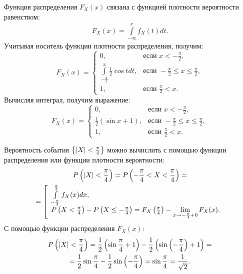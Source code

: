 Функция распределения $F_X(x)$ связана с функцией плотности вероятности равенством:
\begin{gather}
    F_X(x) = \int \limits_{-\infty}^x f_X(t) dt .
\end{gather}
Учитывая носитель функции плотности распределения, получим:
\begin{equation}
    F_X(x)
    = \left \{
    \begin{array}{ll}
        0,                                              & \text{если } x < - \frac{\pi}{2},                    \\
        \int \limits_{-\frac{\pi}{2}}^x \frac{1}{2} \cos t dt, & \text{если } -\frac{\pi}{2} \le x \le \frac{\pi}{2}, \\
        1,                                              & \text{если } \frac{\pi}{2} < x .
    \end{array}
    \right .
\end{equation}
Вычисляя интеграл, получим выражение:
\begin{equation}
    F_X(x)
    = \left \{
    \begin{array}{ll}
        0,                                       & \text{если } x < - \frac{\pi}{2},                    \\
        \frac{1}{2} \left ( \sin x + 1 \right ), & \text{если } -\frac{\pi}{2} \le x \le \frac{\pi}{2}, \\
        1,                                       & \text{если } \frac{\pi}{2} < x .
    \end{array}
    \right .
\end{equation}

Вероятность события $\left \{ \left | X \right | < \frac{\pi}{4} \right \}$ можно вычислить с помощью функции распределения или функции плотности вероятности:
\begin{multline}
    P \left ( \left | X \right | < \frac{\pi}{4} \right )
    = P \left ( -\frac{\pi}{4} < X < \frac{\pi}{4} \right ) = \\
    = \left [
    \begin{array}{l}
        \int \limits_{-\frac{\pi}{4}}^{\frac{\pi}{4}} f_X(x) dx , \\
        P \left ( X < \frac{\pi}{4} \right ) - P \left ( X \le -\frac{\pi}{4} \right ) = F_X \left ( \frac{\pi}{4} \right ) - \lim \limits_{x \rightarrow - \frac{\pi}{4}+0} F_X(x) .
    \end{array}
    \right .
\end{multline}
С помощью функции распределения $F_X(x)$:
\begin{multline}
    P \left ( \left | X \right | < \frac{\pi}{4} \right )
    = \frac{1}{2} \left ( \sin \frac{\pi}{4} + 1 \right ) - \frac{1}{2} \left ( \sin \left ( - \frac{\pi}{4} \right ) + 1 \right ) = \\
    = \frac{1}{2} \sin \frac{\pi}{4} - \frac{1}{2} \sin \left ( - \frac{\pi}{4} \right )
    = \sin \frac{\pi}{4}
    = \frac{1}{\sqrt{2}} .
\end{multline}

